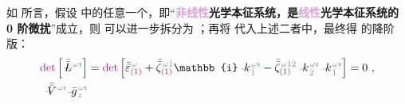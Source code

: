 如  所言，假设  中的任意一个，即“\textbf{\textcolor{Plum}{非线性}\textcolor{NavyBlue}{光学}\textcolor{PineGreen}{本征系统}，是\textcolor{Plum}{线性}\textcolor{NavyBlue}{光学}\textcolor{PineGreen}{本征系统}的 \textcolor{NavyBlue}{0 阶微扰}}”成立，则  可以进一步拆分为 ；再将  代入上述二者中，最终得  的降阶版：
\begin{subequations} \label{eq:nonlinear(2)-wave_wkrho-simplify6'}
\begin{align}
	\textcolor{Plum}{\det} \left[ \Xint{\mathcolor{gray}{-}}{32}{\bar{\bar{L}}}^{\;\! \mathcolor{gray}{\omega} \textcolor{PineGreen}{\imath}} \right] &= \textcolor{Plum}{\det} \left[ \bar{\bar{\varepsilon}}^{\;\! \mathcolor{gray}{\omega}}_{\textcolor{Maroon}{(1)}} + \bar{\bar{\zeta}}^{\;\! \mathcolor{gray}{\omega} \mathcolor{gray}{\check{1}}}_{\textcolor{Maroon}{(1)}} \mathbb{i} \Xint{\begin{smallmatrix} ~ \\ {}^{}_{\mathcolor{gray}{-}} \\ ~ \end{smallmatrix}}{15}{k}_{\;\! \mathcolor{gray}{\check{1}}}^{\;\! \mathcolor{gray}{\omega} \textcolor{PineGreen}{\imath}} - \bar{\bar{\zeta}}^{\;\! \mathcolor{gray}{\omega} \mathcolor{gray}{\check{1} \check{2}}}_{\textcolor{Maroon}{(1)}} \Xint{\begin{smallmatrix} ~ \\ {}^{}_{\mathcolor{gray}{-}} \\ ~ \end{smallmatrix}}{15}{k}_{\;\! \mathcolor{gray}{\check{2}}}^{\;\! \mathcolor{gray}{\omega} \textcolor{PineGreen}{\imath}} \Xint{\begin{smallmatrix} ~ \\ {}^{}_{\mathcolor{gray}{-}} \\ ~ \end{smallmatrix}}{15}{k}_{\;\! \mathcolor{gray}{\check{1}}}^{\;\! \mathcolor{gray}{\omega} \textcolor{PineGreen}{\imath}} \right] = 0 ~, \label{eq:nonlinear(2)-wave_wkrho-simplify6-L3'} \\
	\Xint{\mathcolor{gray}{-}}{25}{\bar{\bar{V}}}^{\;\! \mathcolor{gray}{\omega} \textcolor{PineGreen}{\imath}} \Xint{{}^{}_{\mathcolor{gray}{-}}}{10}{\bar{g}}^{\;\!\mathcolor{gray}{\omega} \textcolor{PineGreen}{\imath}}_{\;\! \mathcolor{gray}{z}}

\end{align}
\end{subequations}

